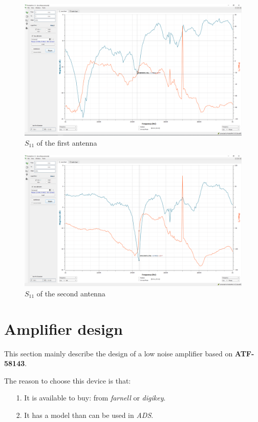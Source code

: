 \documentclass[12pt,a4paper]{report}
\begin{document}
\begin{figure}[ht]
    \centerline{\includegraphics[scale=0.35]{s11_antenna_1}}
    \caption{$S_{11}$ of the first antenna}
    \label{fig:s11_antenna_1}
\end{figure}

\begin{figure}[ht]
    \centerline{\includegraphics[scale=0.35]{s11_antenna_2}}
    \caption{$S_{11}$ of the second antenna}
    \label{fig:s11_antenna_2}
\end{figure}

\chapter{Amplifier design}
This section mainly describe the design of a low noise amplifier based on \textbf{ATF-58143}. 

The reason to choose this device is that:
\begin{itemize}
    \item[1.] It is available to buy: from \emph{farnell} or \emph{digikey}.
    \item[2.] It has a model than can be used in \emph{ADS}.
\end{itemize}
\end{document}
